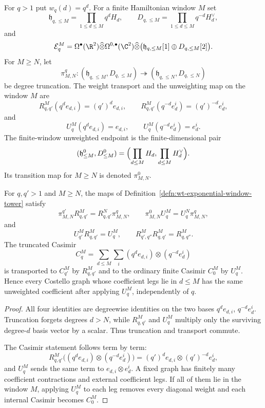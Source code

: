 \begin{defn}
\label{defn:wt-exponential-window-tower}
  For \(q>1\) put \(w_q(d)=q^d\).  For a finite Hamiltonian
  window \(M\) set
  \[
    \mathfrak h_{q,\leq M}=\prod_{1\leq d\leq M}q^dH_d,\qquad
    D_{q,\leq M}=\prod_{1\leq d\leq M}q^{-d}H_d^\vee,
  \]
  and
  \[
    \mathcal E_{q}^{M}
      =\Omega^\bullet(\R^2)\widehat\otimes
        \Omega^{0,\bullet}(\C^2)\widehat\otimes
      \bigl(\mathfrak h_{q,\leq M}[1]\oplus D_{q,\leq M}[2]\bigr).
  \]
  For \(M\geq N\), let
  \[
    \pi^q_{M,N}\colon
    (\mathfrak h_{q,\leq M},D_{q,\leq M})
      \twoheadrightarrow
    (\mathfrak h_{q,\leq N},D_{q,\leq N})
  \]
  be degree truncation.  The weight transport and the unweighting map
  on the window \(M\) are
  \[
    R^M_{q,q'}(q^de_{d,i})=(q')^de_{d,i},\qquad
    R^M_{q,q'}(q^{-d}e_d^i)=(q')^{-d}e_d^i,
  \]
  and
  \[
    U^M_q(q^de_{d,i})=e_{d,i},\qquad
    U^M_q(q^{-d}e_d^i)=e_d^i.
  \]
  The finite-window unweighted endpoint is the finite-dimensional pair
  \[
    (\mathfrak h^0_{\leq M},D^0_{\leq M})
      =\Bigl(\prod_{d\leq M}H_d,\prod_{d\leq M}H_d^\vee\Bigr).
  \]
  Its transition map for \(M\geq N\) is denoted
  \(\pi^0_{M,N}\).
\end{defn}

\begin{lem}
\label{lem:wt-window-transport-squares}
  For \(q,q'>1\) and \(M\geq N\), the maps of
  Definition~\ref{defn:wt-exponential-window-tower} satisfy
  \[
    \pi^{q'}_{M,N}R^M_{q,q'}=R^N_{q,q'}\pi^q_{M,N},\qquad
    \pi^0_{M,N}U^M_q=U^N_q\pi^q_{M,N},
  \]
  and
  \[
    U^M_{q'}R^M_{q,q'}=U^M_q,\qquad
    R^M_{q',q''}R^M_{q,q'}=R^M_{q,q''}.
  \]
  The truncated Casimir
  \[
    C^M_q=\sum_{d\leq M}\sum_i
      (q^de_{d,i})\otimes(q^{-d}e_d^i)
  \]
  is transported to \(C^M_{q'}\) by \(R^M_{q,q'}\) and to the
  ordinary finite Casimir \(C^M_0\) by \(U^M_q\).  Hence every
  Costello graph whose coefficient legs lie in \(d\leq M\) has the
  same unweighted coefficient after applying \(U^M_q\), independently
  of \(q\).
\end{lem}

\begin{proof}
  All four identities are degreewise identities on the two bases
  \(q^de_{d,i}\), \(q^{-d}e_d^i\).  Truncation forgets degrees
  \(d>N\), while \(R^M_{q,q'}\) and \(U^M_q\) multiply only the
  surviving degree-\(d\) basis vector by a scalar.  Thus truncation and
  transport commute.

  The Casimir statement follows term by term:
  \[
    R^M_{q,q'}\bigl((q^de_{d,i})\otimes(q^{-d}e_d^i)\bigr)
      =(q')^de_{d,i}\otimes(q')^{-d}e_d^i,
  \]
  and \(U^M_q\) sends the same term to
  \(e_{d,i}\otimes e_d^i\).  A fixed graph has finitely many
  coefficient contractions and external coefficient legs.  If all of
  them lie in the window \(M\), applying \(U^M_q\) to each leg removes
  every diagonal weight and each internal Casimir becomes \(C^M_0\).
\end{proof}

